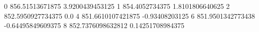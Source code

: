 0 856.51513671875 3.9200439453125
1 854.4052734375 1.8101806640625
2 852.5950927734375 0.0
4 851.6610107421875 -0.93408203125
6 851.9501342773438 -0.64495849609375
8 852.7376098632812 0.14251708984375
